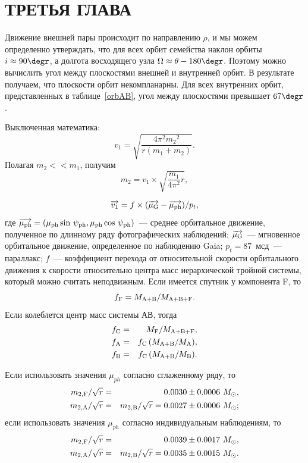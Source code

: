 \documentclass[
 aps, pra,
 amsmath,amssymb,
 11pt,
 final,
tightenlines,
 twoside,
 twocolumn,
 nofloats,
nofootinbib,
 superscriptaddress,
showkeys,
showkeywords,
 ]
{revtex4-2}
\begin{document}
\section{ТРЕТЬЯ ГЛАВА}

Движение внешней пары происходит по направлению $\rho$, и мы можем
определенно утверждать, что для всех орбит семейства наклон орбиты
$i\approx90\degr$, а долгота восходящего узла
$\Omega\approx\theta-180\degr$. Поэтому можно вычислить угол между
плоскостями внешней и внутренней орбит. В результате получаем, что
плоскости орбит некомпланарны. Для всех внутренних орбит,
представленных в таблице~\ref{orbAB}, угол между плоскостями
превышает $67\degr$.


Выключенная математика:
\begin{equation}
\label{one} 
v_1=\sqrt{\dfrac{4\pi^2{m_2}^2}{r(m_1+m_2)}}.\nonumber
\end{equation}
Полагая $m_2<<m_1$, получим
\begin{equation}
\label{two} 
m_2=v_1 \times\sqrt{\dfrac{m_1}{4\pi^2}r},\nonumber
\end{equation}

\begin{equation}
\label{three}
\overrightarrow{v_1}=f\times(\overrightarrow{\mu_{\rm
G}}-\overrightarrow{\mu_{\rm ph}})/p_t,\nonumber
\end{equation}
где $\overrightarrow{\mu_{\rm ph}}=(\mu_{\rm ph} \sin\,\psi_{\rm
ph},\mu_{\rm ph} \cos\,\psi_{\rm ph})$~---  среднее орбитальное
движение, полученное по длинному ряду фотографических наблюдений;
$\overrightarrow{\mu_{\rm G}}$~---  мгновенное орбитальное
движение, определенное по наблюдению Gaia; \mbox
{$p_t=87$}~мсд~--- параллакс; $f$~--- коэффициент перехода от
относительной скорости орбитального движения к скорости
относительно центра масс иерархической тройной системы, который
можно считать неподвижным. Если имеется спутник у компонента F, то
$$f_{\rm F}=M_{\rm A+B}/M_{\rm A+B+F}.$$ Если колеблется центр
масс системы АВ,
 тогда
\begin{eqnarray}
 f_{\rm C}&=&M_{\rm F}/M_{\rm A+B+F},\nonumber\\
 f_{\rm A}&=&f_{\rm C}\,(M_{\rm A+B}/M_{\rm A}),\nonumber\\
 f_{\rm B}&=&f_{\rm C}\,(M_{\rm A+B}/M_{\rm B}).\nonumber
\end{eqnarray}

Если использовать значения $\mu_{ph}$ согласно сглаженному ряду,
то
\begin{eqnarray}
 m_{2,{\rm F}}/\sqrt{r}&=&0.0030\pm0.0006~M_\odot,\nonumber\\
 m_{2,{\rm A}}/\sqrt{r}&=&m_{2,{\rm B}}/\sqrt{r}=0.0027\pm0.0006~M_\odot;\nonumber
\end{eqnarray}
если использовать значения $\mu_{ph}$ согласно индивидуальным
наблюдениям, то
\begin{eqnarray}
 m_{2,{\rm F}}/\sqrt{r}&=&0.0039\pm0.0017~M_\odot,\nonumber\\
 m_{2,{\rm A}}/\sqrt{r}&=&m_{2,{\rm B}}/\sqrt{r}=0.0035\pm0.0015~M_\odot.\nonumber
\end{eqnarray}
\end{document}
